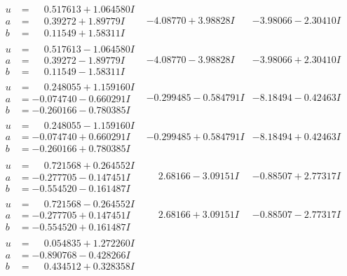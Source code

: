 \documentclass[1p]{elsarticle_modified}
\theoremstyle{definition}
\begin{document}
$$\begin{array}{c|c|c}
\begin{aligned}
u &= \phantom{-}0.517613 + 1.064580 I \\
a &= \phantom{-}0.39272 + 1.89779 I \\
b &= \phantom{-}0.11549 + 1.58311 I\end{aligned}
 & -4.08770 + 3.98828 I & -3.98066 - 2.30410 I \\ \hline\begin{aligned}
u &= \phantom{-}0.517613 - 1.064580 I \\
a &= \phantom{-}0.39272 - 1.89779 I \\
b &= \phantom{-}0.11549 - 1.58311 I\end{aligned}
 & -4.08770 - 3.98828 I & -3.98066 + 2.30410 I \\ \hline\begin{aligned}
u &= \phantom{-}0.248055 + 1.159160 I \\
a &= -0.074740 - 0.660291 I \\
b &= -0.260166 - 0.780385 I\end{aligned}
 & -0.299485 - 0.584791 I & -8.18494 - 0.42463 I \\ \hline\begin{aligned}
u &= \phantom{-}0.248055 - 1.159160 I \\
a &= -0.074740 + 0.660291 I \\
b &= -0.260166 + 0.780385 I\end{aligned}
 & -0.299485 + 0.584791 I & -8.18494 + 0.42463 I \\ \hline\begin{aligned}
u &= \phantom{-}0.721568 + 0.264552 I \\
a &= -0.277705 - 0.147451 I \\
b &= -0.554520 - 0.161487 I\end{aligned}
 & \phantom{-}2.68166 - 3.09151 I & -0.88507 + 2.77317 I \\ \hline\begin{aligned}
u &= \phantom{-}0.721568 - 0.264552 I \\
a &= -0.277705 + 0.147451 I \\
b &= -0.554520 + 0.161487 I\end{aligned}
 & \phantom{-}2.68166 + 3.09151 I & -0.88507 - 2.77317 I \\ \hline\begin{aligned}
u &= \phantom{-}0.054835 + 1.272260 I \\
a &= -0.890768 - 0.428266 I \\
b &= \phantom{-}0.434512 + 0.328358 I\end{aligned}

\end{array}$$
\end{document}
